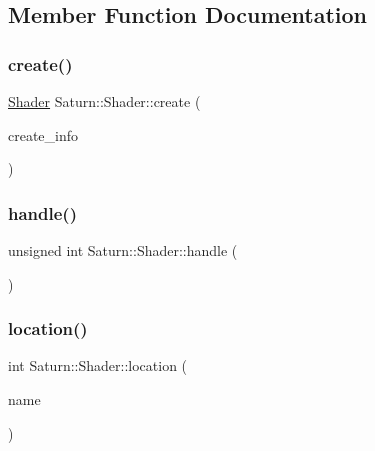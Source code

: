 \subsection{Member Function Documentation}
\mbox{\label{class_saturn_1_1_shader_abb3c38a9a563aafaaa55b0f5a88b79d0}} 
\subsubsection{\texorpdfstring{create()}{create()}}
{\footnotesize\ttfamily \mbox{\hyperlink{class_saturn_1_1_shader}{Shader}} Saturn\+::\+Shader\+::create (\begin{DoxyParamCaption}\item[{\mbox{\hyperlink{struct_saturn_1_1_shader_1_1_create_info}{Create\+Info}}}]{create\+\_\+info }\end{DoxyParamCaption})\hspace{0.3cm}{\ttfamily [static]}}

\mbox{\label{class_saturn_1_1_shader_a10f70a410490c8437d38e262a8e863eb}} 
\subsubsection{\texorpdfstring{handle()}{handle()}}
{\footnotesize\ttfamily unsigned int Saturn\+::\+Shader\+::handle (\begin{DoxyParamCaption}{ }\end{DoxyParamCaption})}

\mbox{\label{class_saturn_1_1_shader_a63d7efc6ec1283109db058770df501f7}} 
\subsubsection{\texorpdfstring{location()}{location()}}
{\footnotesize\ttfamily int Saturn\+::\+Shader\+::location (\begin{DoxyParamCaption}\item[{std\+::string\+\_\+view}]{name }\end{DoxyParamCaption})}

